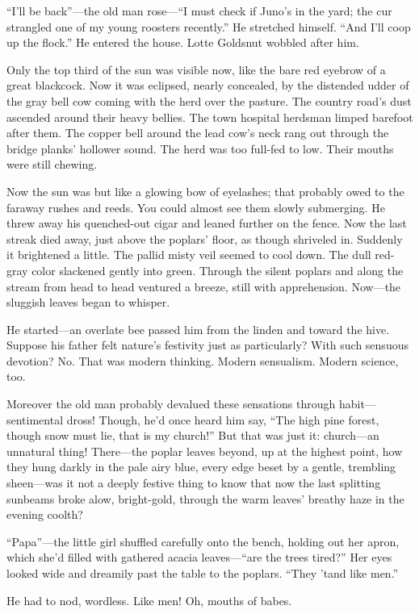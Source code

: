 \documentclass[12pt,a4paper]{article}
\begin{document}
“I’ll be back”—the old man rose—“I must check if Juno’s in the yard; the cur strangled one of my young roosters recently.” He stretched himself. “And I’ll coop up the flock.” He entered the house. Lotte Goldsnut wobbled after him.

Only the top third of the sun was visible now, like the bare red eyebrow of a great blackcock. Now it was eclipsed, nearly concealed, by the distended udder of the gray bell cow coming with the herd over the pasture. The country road’s dust ascended around their heavy bellies. The town hospital herdsman limped barefoot after them. The copper bell around the lead cow’s neck rang out through the bridge planks’ hollower sound. The herd was too full-fed to low. Their mouths were still chewing.

Now the sun was but like a glowing bow of eyelashes; that probably owed to the faraway rushes and reeds. You could almost see them slowly submerging. He threw away his quenched-out cigar and leaned further on the fence. Now the last streak died away, just above the poplars’ floor, as though shriveled in. Suddenly it brightened a little. The pallid misty veil seemed to cool down. The dull red-gray color slackened gently into green. Through the silent poplars and along the stream from head to head ventured a breeze, still with apprehension. Now—the sluggish leaves began to whisper.

He started—an overlate bee passed him from the linden and toward the hive. Suppose his father felt nature’s festivity just as particularly? With such sensuous devotion? No. That was modern thinking. Modern sensualism. Modern science, too.

Moreover the old man probably devalued these sensations through habit—sentimental dross! Though, he’d once heard him say, “The high pine forest, though snow must lie, that is my church!” But that was just it: church—an unnatural thing! There—the poplar leaves beyond, up at the highest point, how they hung darkly in the pale airy blue, every edge beset by a gentle, trembling sheen—was it not a deeply festive thing to know that now the last splitting sunbeams broke alow, bright-gold, through the warm leaves’ breathy haze in the evening coolth?

“Papa”—the little girl shuffled carefully onto the bench, holding out her apron, which she’d filled with gathered acacia leaves—“are the trees tired?” Her eyes looked wide and dreamily past the table to the poplars. “They ’tand like men.”

He had to nod, wordless. Like men! Oh, mouths of babes.
\end{document}
